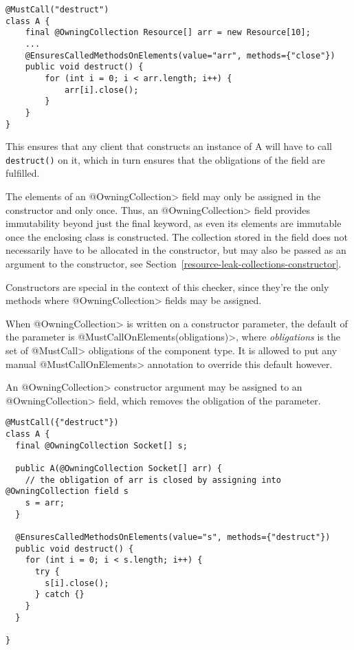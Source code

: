 \begin{verbatim}
@MustCall("destruct")
class A {
    final @OwningCollection Resource[] arr = new Resource[10];
    ...
    @EnsuresCalledMethodsOnElements(value="arr", methods={"close"})
    public void destruct() {
        for (int i = 0; i < arr.length; i++) {
            arr[i].close();
        }
    }
}
\end{verbatim}

This ensures that any client that constructs an instance of A will have to call \texttt{destruct()} on it, which in turn ensures that the obligations of the field are fulfilled.

The elements of an \<@OwningCollection> field may only be assigned in the constructor and only once. Thus, an \<@OwningCollection> field provides immutability beyond just the final keyword, as even its elements are immutable once the enclosing class is constructed. The collection stored in the field does not necessarily have to be allocated in the constructor, but may also be passed as an argument to the constructor, see Section~\ref{resource-leak-collections-constructor}.

Constructors are special in the context of this checker, since they're the only methods where \<@OwningCollection> fields may be assigned.

When \<@OwningCollection> is written on a constructor parameter, the default of the parameter is \<@MustCallOnElements(obligations)>, where \textit{obligations} is the set of \<@MustCall> obligations of the component type. It is allowed to put any manual \<@MustCallOnElements> annotation to override this default however.

An \<@OwningCollection> constructor argument may be assigned to an \<@OwningCollection> field, which removes the obligation of the parameter.

\begin{verbatim}
@MustCall({"destruct"})
class A {
  final @OwningCollection Socket[] s;

  public A(@OwningCollection Socket[] arr) {
    // the obligation of arr is closed by assigning into @OwningCollection field s
    s = arr;
  }

  @EnsuresCalledMethodsOnElements(value="s", methods={"destruct"})
  public void destruct() {
    for (int i = 0; i < s.length; i++) {
      try {
        s[i].close();
      } catch {}
    }
  }

}
\end{verbatim}

